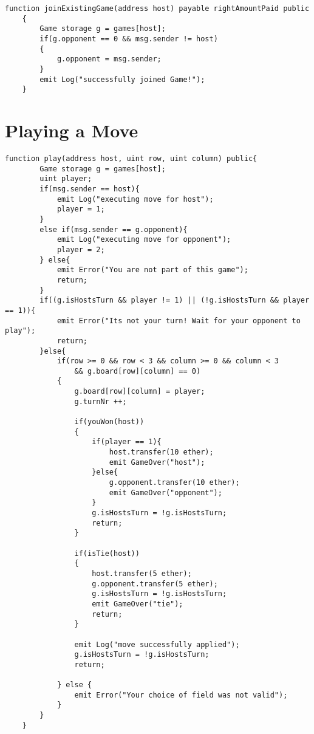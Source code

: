 \documentclass[11pt]{article}
\begin{document}
\begin{Verbatim}[fontsize=\small]
    function joinExistingGame(address host) payable rightAmountPaid public
    {
        Game storage g = games[host];
        if(g.opponent == 0 && msg.sender != host)
        {
            g.opponent = msg.sender;
        }
        emit Log("successfully joined Game!");
    }
\end{Verbatim}

\section{Playing a Move}
\begin{Verbatim}[fontsize=\small]
    function play(address host, uint row, uint column) public{
        Game storage g = games[host];
        uint player;
        if(msg.sender == host){
            emit Log("executing move for host");
            player = 1;
        }
        else if(msg.sender == g.opponent){
            emit Log("executing move for opponent");
            player = 2;
        } else{
            emit Error("You are not part of this game");
            return;
        }
        if((g.isHostsTurn && player != 1) || (!g.isHostsTurn && player == 1)){
            emit Error("Its not your turn! Wait for your opponent to play");
            return;
        }else{
            if(row >= 0 && row < 3 && column >= 0 && column < 3 
            	&& g.board[row][column] == 0)
            {
                g.board[row][column] = player;
                g.turnNr ++;

                if(youWon(host))
                {
                    if(player == 1){
                        host.transfer(10 ether);
                        emit GameOver("host");
                    }else{
                        g.opponent.transfer(10 ether);
                        emit GameOver("opponent");
                    }
                    g.isHostsTurn = !g.isHostsTurn;
                    return;
                }

                if(isTie(host))
                {
                    host.transfer(5 ether);
                    g.opponent.transfer(5 ether);
                    g.isHostsTurn = !g.isHostsTurn;
                    emit GameOver("tie");
                    return;
                }

                emit Log("move successfully applied");
                g.isHostsTurn = !g.isHostsTurn;
                return;

            } else {
                emit Error("Your choice of field was not valid");
            }
        }
    }
\end{Verbatim}
\end{document}
